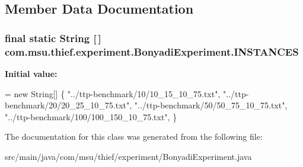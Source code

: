 \subsection{Member Data Documentation}
\hypertarget{classcom_1_1msu_1_1thief_1_1experiment_1_1BonyadiExperiment_a6713640646f3d6dc1d9991afc8bf1190}{
\subsubsection[{I\-N\-S\-T\-A\-N\-C\-E\-S}]{\setlength{\rightskip}{0pt plus 5cm}final static String \mbox{[}$\,$\mbox{]} com.\-msu.\-thief.\-experiment.\-Bonyadi\-Experiment.\-I\-N\-S\-T\-A\-N\-C\-E\-S\hspace{0.3cm}{\ttfamily [static]}}}\label{classcom_1_1msu_1_1thief_1_1experiment_1_1BonyadiExperiment_a6713640646f3d6dc1d9991afc8bf1190}
{\bfseries Initial value\-:}
\begin{DoxyCode}
= \textcolor{keyword}{new} String[] \{ 
            \textcolor{stringliteral}{"../ttp-benchmark/10/10\_15\_10\_75.txt"},
            \textcolor{stringliteral}{"../ttp-benchmark/20/20\_25\_10\_75.txt"},
            \textcolor{stringliteral}{"../ttp-benchmark/50/50\_75\_10\_75.txt"},
            \textcolor{stringliteral}{"../ttp-benchmark/100/100\_150\_10\_75.txt"},
    \}
\end{DoxyCode}


The documentation for this class was generated from the following file\-:\begin{DoxyCompactItemize}
\item 
src/main/java/com/msu/thief/experiment/Bonyadi\-Experiment.\-java\end{DoxyCompactItemize}
